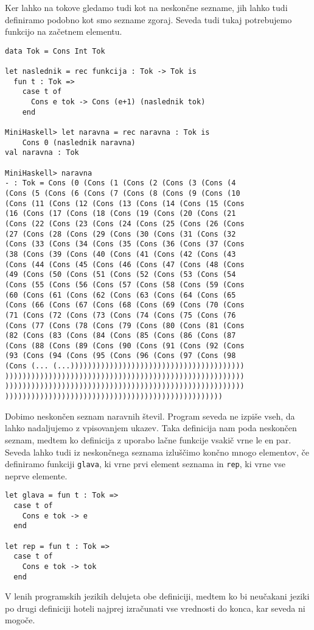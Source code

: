 \documentclass[12pt,a4paper,openany]{book}
\begin{document}
Ker lahko na tokove gledamo tudi kot na neskončne sezname, jih lahko tudi definiramo podobno kot smo sezname zgoraj. Seveda tudi tukaj 
potrebujemo funkcijo na začetnem elementu.
\begin{lstlisting}
data Tok = Cons Int Tok

let naslednik = rec funkcija : Tok -> Tok is
  fun t : Tok =>
    case t of
      Cons e tok -> Cons (e+1) (naslednik tok)
    end

MiniHaskell> let naravna = rec naravna : Tok is
    Cons 0 (naslednik naravna)
val naravna : Tok

MiniHaskell> naravna
- : Tok = Cons (0 (Cons (1 (Cons (2 (Cons (3 (Cons (4 
(Cons (5 (Cons (6 (Cons (7 (Cons (8 (Cons (9 (Cons (10 
(Cons (11 (Cons (12 (Cons (13 (Cons (14 (Cons (15 (Cons 
(16 (Cons (17 (Cons (18 (Cons (19 (Cons (20 (Cons (21 
(Cons (22 (Cons (23 (Cons (24 (Cons (25 (Cons (26 (Cons 
(27 (Cons (28 (Cons (29 (Cons (30 (Cons (31 (Cons (32 
(Cons (33 (Cons (34 (Cons (35 (Cons (36 (Cons (37 (Cons 
(38 (Cons (39 (Cons (40 (Cons (41 (Cons (42 (Cons (43 
(Cons (44 (Cons (45 (Cons (46 (Cons (47 (Cons (48 (Cons 
(49 (Cons (50 (Cons (51 (Cons (52 (Cons (53 (Cons (54 
(Cons (55 (Cons (56 (Cons (57 (Cons (58 (Cons (59 (Cons 
(60 (Cons (61 (Cons (62 (Cons (63 (Cons (64 (Cons (65 
(Cons (66 (Cons (67 (Cons (68 (Cons (69 (Cons (70 (Cons 
(71 (Cons (72 (Cons (73 (Cons (74 (Cons (75 (Cons (76 
(Cons (77 (Cons (78 (Cons (79 (Cons (80 (Cons (81 (Cons 
(82 (Cons (83 (Cons (84 (Cons (85 (Cons (86 (Cons (87 
(Cons (88 (Cons (89 (Cons (90 (Cons (91 (Cons (92 (Cons 
(93 (Cons (94 (Cons (95 (Cons (96 (Cons (97 (Cons (98 
(Cons (... (...))))))))))))))))))))))))))))))))))))))))
)))))))))))))))))))))))))))))))))))))))))))))))))))))))
)))))))))))))))))))))))))))))))))))))))))))))))))))))))
))))))))))))))))))))))))))))))))))))))))))))))))))
\end{lstlisting}
Dobimo neskončen seznam naravnih števil. Program seveda ne izpiše vseh, da lahko nadaljujemo z vpisovanjem ukazev. 
Taka definicija nam poda neskončen seznam, medtem ko definicija z uporabo lačne funkcije vsakič vrne le en par. 
Seveda lahko tudi iz neskončnega seznama izluščimo končno mnogo elementov, če definiramo funkciji \lstinline{glava}, 
ki vrne prvi element seznama in \lstinline{rep}, ki vrne vse neprve elemente. 
\begin{lstlisting}
let glava = fun t : Tok =>
  case t of 
    Cons e tok -> e
  end

let rep = fun t : Tok =>
  case t of 
    Cons e tok -> tok
  end
\end{lstlisting}
V lenih programskih jezikih delujeta obe definiciji, medtem ko 
bi neučakani jeziki po drugi definiciji hoteli najprej izračunati vse vrednosti do konca, kar seveda ni mogoče.  
\end{document}
